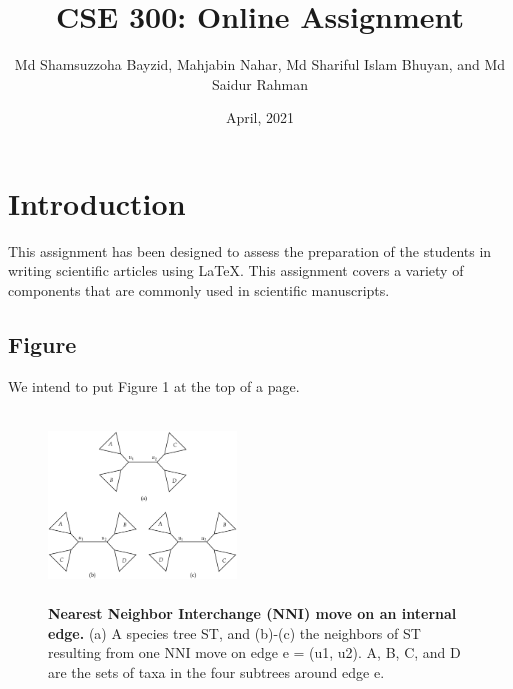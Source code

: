 \documentclass[11pt]{article}
\title{CSE 300: Online Assignment}
\author{Md Shamsuzzoha Bayzid, Mahjabin Nahar, Md Shariful Islam Bhuyan,
and Md Saidur Rahman}
\date{April, 2021}
\begin{document}
\maketitle
\section{Introduction}
This assignment has been designed to assess the preparation of the students in writing
scientific articles using \LaTeX. This assignment covers a variety of components that are
commonly used in scientific manuscripts.
\subsection{Figure}
We intend to put Figure 1 at the top of a page.
\begin{figure}[t]
	\centering
	\includegraphics[width=5cm,height=5cm,scale=0.4]{17-CSE300_online-Figure3.pdf}
	\caption{\textbf{Nearest Neighbor Interchange (NNI) move on an internal edge.} (a) A species tree ST, and (b)-(c) the neighbors of ST resulting from one NNI move on edge e = (u1, u2). A, B, C, and D are the sets of taxa in the four subtrees around edge e.}
\end{figure}
\end{document}
